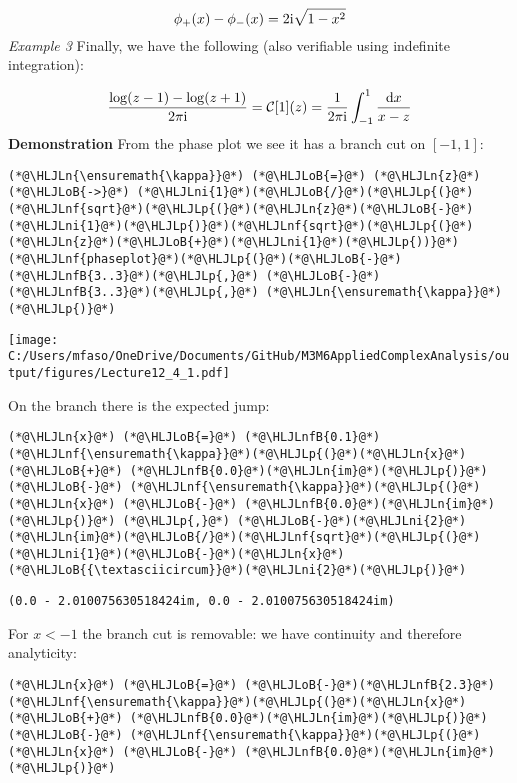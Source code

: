 \documentclass[12pt,a4paper]{article}
\newcommand{\HLJLn}[1]{#1}
\newcommand{\HLJLnf}[1]{\textcolor[RGB]{66,102,213}{#1}}
\newcommand{\HLJLnfB}[1]{\textcolor[RGB]{59,151,46}{#1}}
\newcommand{\HLJLni}[1]{\textcolor[RGB]{59,151,46}{#1}}
\newcommand{\HLJLoB}[1]{\textcolor[RGB]{102,102,102}{\textbf{#1}}}
\newcommand{\HLJLp}[1]{#1}
\def\D{ {\rm d} }
\def\I{ {\rm i} }
\def\dx{\D x}
\begin{document}
\[
\phi_+(x) - \phi_-(x) = 2\I \sqrt{1-x^2}
\]
\emph{Example 3} Finally, we have the following (also verifiable using indefinite integration):

\[
{\log(z-1) - \log(z+1) \over 2 \pi \I} =  {\cal C}[1](z) = {1 \over 2 \pi \I} \int_{-1}^1 {\dx \over x -z}
\]
\textbf{Demonstration} From the phase plot we see it has a branch cut on $[-1,1]$:


\begin{lstlisting}
(*@\HLJLn{\ensuremath{\kappa}}@*) (*@\HLJLoB{=}@*) (*@\HLJLn{z}@*) (*@\HLJLoB{->}@*) (*@\HLJLni{1}@*)(*@\HLJLoB{/}@*)(*@\HLJLp{(}@*)(*@\HLJLnf{sqrt}@*)(*@\HLJLp{(}@*)(*@\HLJLn{z}@*)(*@\HLJLoB{-}@*)(*@\HLJLni{1}@*)(*@\HLJLp{)}@*)(*@\HLJLnf{sqrt}@*)(*@\HLJLp{(}@*)(*@\HLJLn{z}@*)(*@\HLJLoB{+}@*)(*@\HLJLni{1}@*)(*@\HLJLp{))}@*)
(*@\HLJLnf{phaseplot}@*)(*@\HLJLp{(}@*)(*@\HLJLoB{-}@*)(*@\HLJLnfB{3..3}@*)(*@\HLJLp{,}@*) (*@\HLJLoB{-}@*)(*@\HLJLnfB{3..3}@*)(*@\HLJLp{,}@*) (*@\HLJLn{\ensuremath{\kappa}}@*)(*@\HLJLp{)}@*)
\end{lstlisting}

\texttt{[image: C:/Users/mfaso/OneDrive/Documents/GitHub/M3M6AppliedComplexAnalysis/output/figures/Lecture12\_4\_1.pdf]}

On the branch there is the expected jump:


\begin{lstlisting}
(*@\HLJLn{x}@*) (*@\HLJLoB{=}@*) (*@\HLJLnfB{0.1}@*)
(*@\HLJLnf{\ensuremath{\kappa}}@*)(*@\HLJLp{(}@*)(*@\HLJLn{x}@*) (*@\HLJLoB{+}@*) (*@\HLJLnfB{0.0}@*)(*@\HLJLn{im}@*)(*@\HLJLp{)}@*) (*@\HLJLoB{-}@*) (*@\HLJLnf{\ensuremath{\kappa}}@*)(*@\HLJLp{(}@*)(*@\HLJLn{x}@*) (*@\HLJLoB{-}@*) (*@\HLJLnfB{0.0}@*)(*@\HLJLn{im}@*)(*@\HLJLp{)}@*) (*@\HLJLp{,}@*) (*@\HLJLoB{-}@*)(*@\HLJLni{2}@*)(*@\HLJLn{im}@*)(*@\HLJLoB{/}@*)(*@\HLJLnf{sqrt}@*)(*@\HLJLp{(}@*)(*@\HLJLni{1}@*)(*@\HLJLoB{-}@*)(*@\HLJLn{x}@*)(*@\HLJLoB{{\textasciicircum}}@*)(*@\HLJLni{2}@*)(*@\HLJLp{)}@*)
\end{lstlisting}

\begin{lstlisting}
(0.0 - 2.010075630518424im, 0.0 - 2.010075630518424im)
\end{lstlisting}


For $x < -1$ the branch cut is removable: we have continuity and therefore analyticity:


\begin{lstlisting}
(*@\HLJLn{x}@*) (*@\HLJLoB{=}@*) (*@\HLJLoB{-}@*)(*@\HLJLnfB{2.3}@*)
(*@\HLJLnf{\ensuremath{\kappa}}@*)(*@\HLJLp{(}@*)(*@\HLJLn{x}@*) (*@\HLJLoB{+}@*) (*@\HLJLnfB{0.0}@*)(*@\HLJLn{im}@*)(*@\HLJLp{)}@*) (*@\HLJLoB{-}@*) (*@\HLJLnf{\ensuremath{\kappa}}@*)(*@\HLJLp{(}@*)(*@\HLJLn{x}@*) (*@\HLJLoB{-}@*) (*@\HLJLnfB{0.0}@*)(*@\HLJLn{im}@*)(*@\HLJLp{)}@*)
\end{lstlisting}
\end{document}

